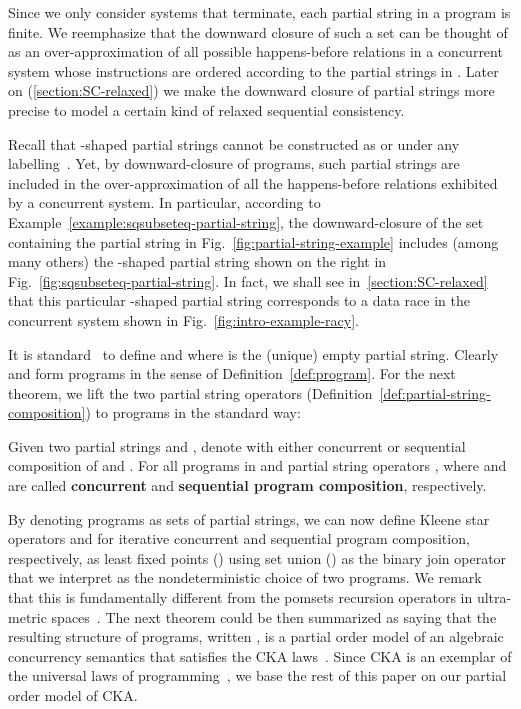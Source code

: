\documentclass{llncs}
\newcommand{\defn}[1]{\textbf{#1}}
\begin{document}
Since we only consider systems that terminate, each partial string  in a program  is finite. We reemphasize that the downward closure of such a set  can be thought of as an over-approximation of all possible happens-before relations in a concurrent system whose instructions are ordered according to the partial strings in . Later on (\autoref{section:SC-relaxed}) we make the downward closure of partial strings more precise to model a certain kind of relaxed sequential consistency.

\begin{example}
\label{example:program}
Recall that -shaped partial strings cannot be constructed as  or  under any labelling~\cite{P1986}. Yet, by downward-closure of programs, such partial strings are included in the over-approximation of all the happens-before relations exhibited by a concurrent system. In particular, according to Example~\ref{example:sqsubseteq-partial-string}, the downward-closure of the set containing the partial string in Fig.~\ref{fig:partial-string-example} includes (among many others) the -shaped partial string shown on the right in Fig.~\ref{fig:sqsubseteq-partial-string}. In fact, we shall see in~\autoref{section:SC-relaxed} that this particular -shaped partial string corresponds to a data race in the concurrent system shown in Fig.~\ref{fig:intro-example-racy}.
\end{example}

It is standard~\cite{G1988,HA2014} to define  and  where  is the (unique) empty partial string. Clearly  and  form programs in the sense of Definition~\ref{def:program}. For the next theorem, we lift the two partial string operators (Definition~\ref{def:partial-string-composition}) to programs in the standard way:

\begin{definition}
\label{def:program-operator}
Given two partial strings  and , denote with  either concurrent or sequential composition of  and . For all programs  in  and partial string operators ,  where  and  are called \defn{concurrent} and \defn{sequential program composition}, respectively.
\end{definition}

By denoting programs as sets of partial strings, we can now define Kleene star operators  and  for iterative concurrent and sequential program composition, respectively, as least fixed points () using set union () as the binary join operator that we interpret as the nondeterministic choice of two programs. We remark that this is fundamentally different from the pomsets recursion operators in ultra-metric spaces~\cite{BW1990}. The next theorem could be then summarized as saying that the resulting structure of programs, written , is a partial order model of an algebraic concurrency semantics that satisfies the CKA laws~\cite{HMSW2011}. Since CKA is an exemplar of the universal laws of programming~\cite{HvS2014}, we base the rest of this paper on our partial order model of CKA.
\end{document}
